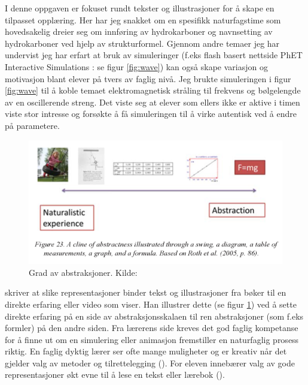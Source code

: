 \documentclass[main.tex]{subfiles}
\begin{document}
\hspace{-6mm}I denne oppgaven er fokuset rundt tekster og illustrasjoner for å skape en tilpasset opplæring. Her har jeg snakket om en spesifikk naturfagstime som hovedsakelig dreier seg om innføring av hydrokarboner og navnsetting av hydrokarboner ved hjelp av strukturformel. Gjennom andre temaer jeg har undervist jeg har erfart at bruk av simuleringer (f.eks flash basert nettside PhET Interactive Simulations : se figur \ref{fig:wave}) kan også skape variasjon og motivasjon blant elever på tvers av faglig nivå. Jeg brukte simuleringen i figur \ref{fig:wave} til å koble temaet elektromagnetisk stråling til frekvens og bølgelengde av en oscillerende streng. Det viste seg at elever som ellers ikke er aktive i timen viste stor intresse og forsøkte å få simuleringen til å virke autentisk ved å endre på parametere.\newline

\begin{figure}[h!]
\centering
\includegraphics[scale = 0.6]{../figures/knain.png}
\caption{Grad av abstraksjoner. Kilde: \protect{}}
\label{fig:knain}
\end{figure}

\hspace{-6mm} skriver at slike representasjoner binder tekst og illustrasjoner fra bøker til en direkte erfaring eller video som viser. Han illustrer dette (se figur \ref{fig:knain}) ved å sette direkte erfaring på en side av abstraksjonsskalaen til ren abstraksjoner (som f.eks formler) på den andre siden. Fra lærerens side kreves det god faglig kompetanse for å finne ut om en simulering eller animasjon fremstiller en naturfaglig prosess riktig. En faglig dyktig lærer ser ofte mange muligheter og er kreativ når det gjelder valg av metoder og tilrettelegging (). For eleven innebærer valg av gode representasjoner økt evne til å lese en tekst eller lærebok ().
\end{document}
